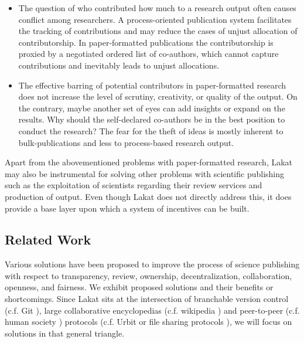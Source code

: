 \begin{itemize}
\item The question of who contributed how much to a research output often causes conflict among researchers. A process-oriented publication system facilitates the tracking of contributions and may reduce the cases of unjust allocation of contributorship. In paper-formatted publications the contributorship is proxied by a negotiated ordered list of co-authors, which cannot capture contributions and inevitably leads to unjust allocations. 

\item The effective barring of potential contributors in paper-formatted research does not increase the level of scrutiny, creativity, or quality of the output. On the contrary, maybe another set of eyes can add insights or expand on the results. Why should the self-declared co-authors be in the best position to conduct the research? The fear for the theft of ideas is mostly inherent to bulk-publications and less to process-based research output. 
\end{itemize}

Apart from the abovementioned problems with paper-formatted research, Lakat may also be instrumental for solving other problems with scientific publishing such as the exploitation of scientists regarding their review services and production of output. Even though Lakat does not directly address this, it does provide a base layer upon which a system of incentives can be built.

\subsection{Related Work}

Various solutions have been proposed to improve the process of science publishing with respect to transparency, review, ownership, decentralization, collaboration, openness, and fairness. We exhibit proposed solutions and their benefits or shortcomings. Since Lakat sits at the intersection of branchable version control (c.f. Git \cite{chacon2014pro,git}), large collaborative encyclopedias (c.f. wikipedia \cite{wikipedia}) and peer-to-peer (c.f. human society \cite{decentralizedhumansocieties}) protocols (c.f. Urbit \cite{urbit} or file sharing protocols \cite{distributed_file_sharing, guidi2021data}), we will focus on solutions in that general triangle.

